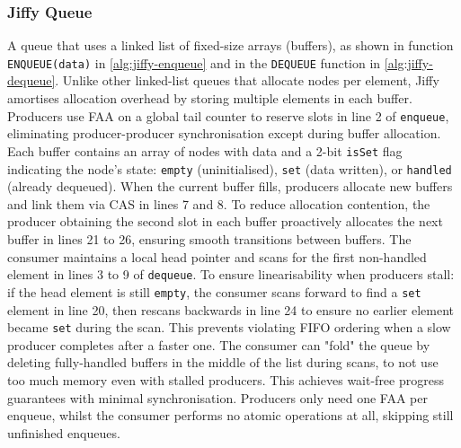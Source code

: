 \subsubsection{Jiffy Queue}\label{subsubsec:jiffy-mpsc-queue}
A queue that uses a linked list of fixed-size arrays (buffers), as shown in function \newline \texttt{ENQUEUE(data)} in \cref{alg:jiffy-enqueue} and in the \texttt{DEQUEUE} function in \cref{alg:jiffy-dequeue}. Unlike other linked-list queues that allocate nodes per element, Jiffy amortises allocation overhead by storing multiple elements in each buffer. Producers use \ac{FAA} on a global tail counter to reserve slots in line 2 of \texttt{enqueue}, eliminating producer-producer synchronisation except during buffer allocation. Each buffer contains an array of nodes with data and a 2-bit \texttt{isSet} flag indicating the node's state: \texttt{empty} (uninitialised), \texttt{set} (data written), or \texttt{handled} (already dequeued). When the current buffer fills, producers allocate new buffers and link them via \ac{CAS} in lines 7 and 8. To reduce allocation contention, the producer obtaining the second slot in each buffer proactively allocates the next buffer in lines 21 to 26, ensuring smooth transitions between buffers. The consumer maintains a local head pointer and scans for the first non-handled element in lines 3 to 9 of \texttt{dequeue}. To ensure linearisability when producers stall: if the head element is still \texttt{empty}, the consumer scans forward to find a \texttt{set} element in line 20, then rescans backwards in line 24 to ensure no earlier element became \texttt{set} during the scan. This prevents violating FIFO ordering when a slow producer completes after a faster one. The consumer can "fold" the queue by deleting fully-handled buffers in the middle of the list during scans, to not use too much memory even with stalled producers. This achieves wait-free progress guarantees with minimal synchronisation. Producers only need one \ac{FAA} per enqueue, whilst the consumer performs no atomic operations at all, skipping still unfinished enqueues. \cite{jiffy}

